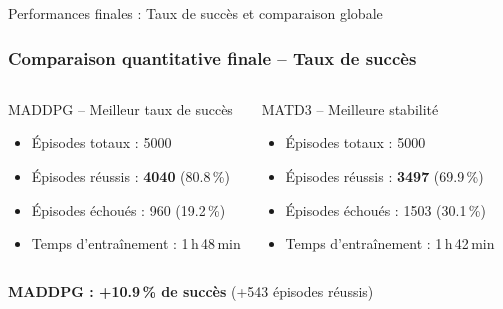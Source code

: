 \documentclass[aspectratio=169]{beamer}
\begin{document}

\begin{frame}{Performances finales : Taux de succès et comparaison globale}
\frametitle{Comparaison quantitative finale – Taux de succès}

\begin{columns}[T]
    \begin{exampleblock}{MADDPG – Meilleur taux de succès}
    \begin{itemize}
        \item Épisodes totaux : 5000
        \item Épisodes réussis : \textbf{4040} (\alert{80.8\,\%})
        \item Épisodes échoués : 960 (19.2\,\%)
        \item Temps d'entraînement : 1\,h\,48\,min
    \end{itemize}
    \end{exampleblock}

    \begin{block}{MATD3 – Meilleure stabilité}
    \begin{itemize}
        \item Épisodes totaux : 5000
        \item Épisodes réussis : \textbf{3497} (69.9\,\%)
        \item Épisodes échoués : 1503 (30.1\,\%)
        \item Temps d'entraînement : 1\,h\,42\,min
    \end{itemize}
    \end{block}
\end{columns}

\begin{center}
\textbf{MADDPG : +10.9\,\% de succès} \quad (+543 épisodes réussis)
\end{center}
\end{frame}
\end{document}
